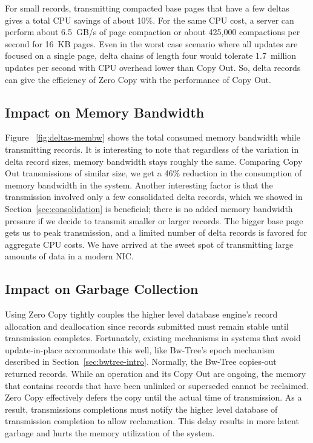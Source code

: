 For small records, transmitting compacted base pages that have a few deltas gives
a total CPU savings of about 10\%. For the same CPU cost, a server can perform
about 6.5~GB/s of page compaction or about 425,000 compactions per second for
16~KB pages. Even in the worst case scenario where all updates are focused on a
single page, delta chains of length four would tolerate 1.7~million updates per
second with CPU overhead lower than Copy Out. So, delta records can give the
efficiency of Zero Copy with the performance of Copy Out.


\subsection{Impact on Memory Bandwidth}
Figure ~\ref{fig:deltas-membw} shows the total consumed memory bandwidth while 
transmitting records. It is interesting to note that regardless of the variation in 
delta record sizes, memory bandwidth stays roughly the same. Comparing Copy Out 
transmissions of similar size, we get a 46\% reduction in the consumption of 
memory bandwidth in the system. Another interesting factor is that the transmission 
involved only a few consolidated delta records, which we showed in Section~\ref{sec:consolidation} is 
beneficial; there is no added memory bandwidth pressure if we decide to transmit smaller 
or larger records. The bigger base page gets us to peak transmission, and a limited number of 
delta records is favored for aggregate CPU costs. We have arrived at the sweet spot of 
transmitting large amounts of data in a modern NIC.


\subsection{Impact on Garbage Collection}

Using Zero Copy tightly couples the higher level database engine's record
allocation and deallocation since records submitted must remain stable until
transmission completes. Fortunately, existing mechanisms in systems that avoid
update-in-place accommodate this well, like Bw-Tree's epoch mechanism described
in Section~\ref{sec:bwtree-intro}. Normally, the Bw-Tree copies-out returned records.
While an operation and its Copy Out are ongoing, the memory that contains records
that have been unlinked or superseded cannot be reclaimed. Zero Copy
effectively defers the copy until the actual time of transmission. As a result,
transmissions completions must notify the higher level database of transmission
completion to allow reclamation. This delay results in more latent garbage and
hurts the memory utilization of the system.

